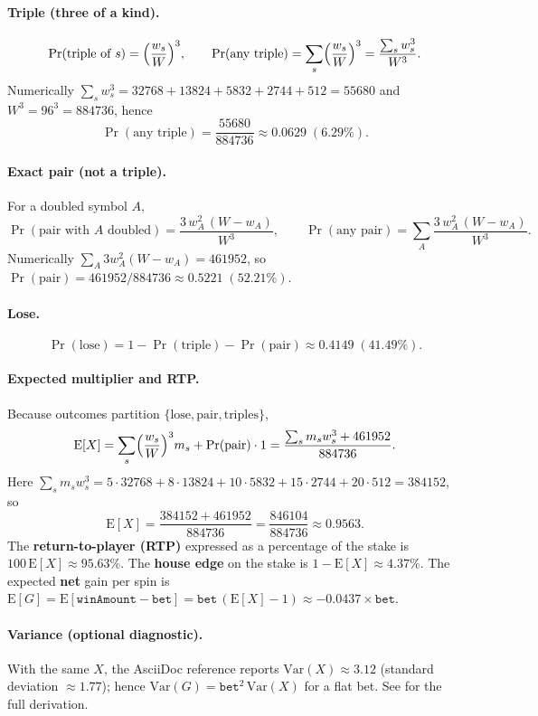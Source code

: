 \documentclass[11pt,a4paper]{article}
\begin{document}
\paragraph{Triple (three of a kind).}
\[
\operatorname{Pr}(\text{triple of }s)=\Bigl(\frac{w_s}{W}\Bigr)^3,
\qquad
\operatorname{Pr}(\text{any triple})=\sum_s \Bigl(\frac{w_s}{W}\Bigr)^3=\frac{\sum_s w_s^3}{W^3}.
\]
Numerically $\sum_s w_s^3 = 32768+13824+5832+2744+512 = 55680$ and $W^3=96^3=884736$, hence
\[
\operatorname{Pr}(\text{any triple})=\frac{55680}{884736}\approx 0.0629\;(6.29\%).
\]

\paragraph{Exact pair (not a triple).}
For a doubled symbol $A$,
\[
\operatorname{Pr}(\text{pair with }A\text{ doubled})=\frac{3\,w_A^2\,(W-w_A)}{W^3},
\qquad
\operatorname{Pr}(\text{any pair})=\sum_A \frac{3\,w_A^2\,(W-w_A)}{W^3}.
\]
Numerically $\sum_A 3w_A^2(W-w_A)=461952$, so $\operatorname{Pr}(\text{pair})=461952/884736\approx 0.5221\;(52.21\%)$.

\paragraph{Lose.}
\[
\operatorname{Pr}(\text{lose})=1-\operatorname{Pr}(\text{triple})-\operatorname{Pr}(\text{pair})\approx 0.4149\;(41.49\%).
\]

\paragraph{Expected multiplier and RTP.}
Because outcomes partition $\{\text{lose},\text{pair},\text{triples}\}$,
\[
\mathrm{E}[X]
  =\sum_s \Bigl(\frac{w_s}{W}\Bigr)^3 m_s + \operatorname{Pr}(\text{pair})\cdot 1
  =\frac{\sum_s m_s w_s^3 + 461952}{884736}.
\]
Here $\sum_s m_s w_s^3 = 5\cdot32768 + 8\cdot13824 + 10\cdot5832 + 15\cdot2744 + 20\cdot512 = 384152$, so
\[
\mathrm{E}[X]=\frac{384152+461952}{884736}=\frac{846104}{884736}\approx 0.9563.
\]
The \textbf{return-to-player (RTP)} expressed as a percentage of the stake is $100\,\mathrm{E}[X]\approx 95.63\%$. The \textbf{house edge} on the stake is $1-\mathrm{E}[X]\approx 4.37\%$. The expected \textbf{net} gain per spin is $\mathrm{E}[G]=\mathrm{E}[\texttt{winAmount}-\texttt{bet}]=\texttt{bet}\,(\mathrm{E}[X]-1)\approx -0.0437\times\texttt{bet}$.

\paragraph{Variance (optional diagnostic).}
With the same $X$, the AsciiDoc reference reports $\mathrm{Var}(X)\approx 3.12$ (standard deviation $\approx 1.77$); hence $\mathrm{Var}(G)=\texttt{bet}^2\,\mathrm{Var}(X)$ for a flat bet. See  for the full derivation.
\end{document}
